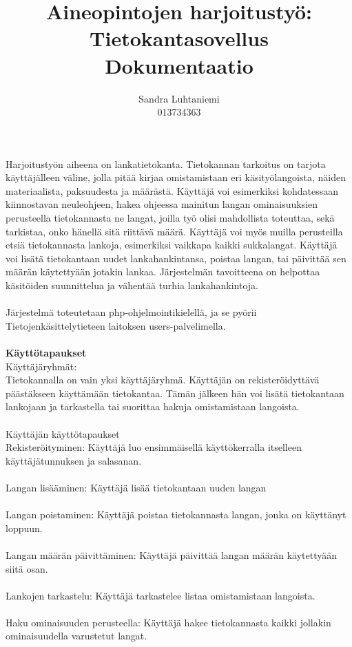 \documentclass[12pt]{article}
\title{Aineopintojen harjoitustyö: Tietokantasovellus\\Dokumentaatio}
\author{Sandra Luhtaniemi\\013734363}
\begin{document}
\maketitle
Harjoitustyön aiheena on lankatietokanta. Tietokannan tarkoitus on tarjota käyttäjälleen väline, jolla pitää kirjaa omistamistaan eri käsityölangoista, näiden materiaalista, paksuudesta ja määrästä. Käyttäjä voi esimerkiksi kohdatessaan kiinnostavan neuleohjeen, hakea ohjeessa mainitun langan ominaisuuksien perusteella tietokannasta ne langat, joilla työ olisi mahdollista toteuttaa, sekä tarkistaa, onko hänellä sitä riittävä määrä. Käyttäjä voi myös muilla perusteilla etsiä tietokannasta lankoja, esimerkiksi vaikkapa kaikki sukkalangat. Käyttäjä voi lisätä tietokantaan uudet lankahankintansa, poistaa langan, tai päivittää sen määrän käytettyään jotakin lankaa. Järjestelmän tavoitteena on helpottaa käsitöiden suunnittelua ja vähentää turhia lankahankintoja.
\\ \ \\
Järjestelmä toteutetaan php-ohjelmointikielellä, ja se pyörii Tietojenkäsittelytieteen laitoksen users-palvelimella.
\\
\ \\
\textbf{Käyttötapaukset}\\ 
Käyttäjäryhmät:\\
Tietokannalla on vain yksi käyttäjäryhmä. Käyttäjän on rekisteröidyttävä päästäkseen käyttämään tietokantaa. Tämän jälkeen hän voi lisätä tietokantaan lankojaan ja tarkastella tai suorittaa hakuja omistamistaan langoista. 
\\ \ \\
Käyttäjän käyttötapaukset\\
Rekisteröityminen: Käyttäjä luo ensimmäisellä käyttökerralla itselleen käyttäjätunnuksen ja salasanan.
\\ \ \\
Langan lisääminen: Käyttäjä lisää tietokantaan uuden langan
\\ \ \\
Langan poistaminen: Käyttäjä poistaa tietokannasta langan, jonka on käyttänyt loppuun.
\\ \ \\
Langan määrän päivittäminen: Käyttäjä päivittää langan määrän käytettyään siitä osan.
\\ \ \\
Lankojen tarkastelu: Käyttäjä tarkastelee listaa omistamistaan langoista.
\\ \ \\
Haku ominaisuuden perusteella: Käyttäjä hakee tietokannasta kaikki jollakin ominaisuudella varustetut langat.
\end{document}

